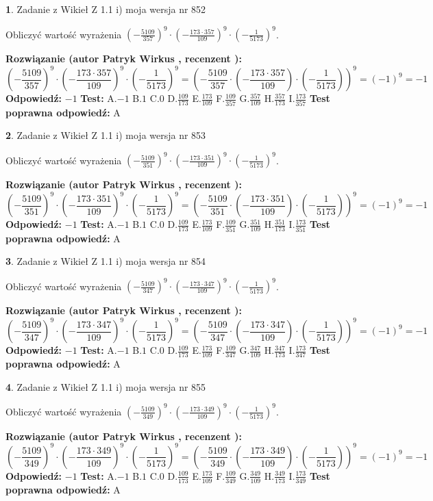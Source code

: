\documentclass[12pt, a4paper]{article}
\theoremstyle{definition} %
\newtheorem{zad}{}
\newcommand{\zadStart}[1]{\begin{zad}#1\newline}
\newcommand{\zadStop}{\end{zad}}
\newcommand{\rozwStart}[2]{\noindent \textbf{Rozwiązanie (autor #1 , recenzent #2): }\newline}
\newcommand{\rozwStop}{\newline}
\newcommand{\odpStart}{\noindent \textbf{Odpowiedź:}\newline}
\newcommand{\odpStop}{\newline}
\newcommand{\testStart}{\noindent \textbf{Test:}\newline}
\newcommand{\testStop}{\newline}
\newcommand{\kluczStart}{\noindent \textbf{Test poprawna odpowiedź:}\newline}
\newcommand{\kluczStop}{\newline}
\begin{document}
\zadStart{Zadanie z Wikieł Z 1.1 i) moja wersja nr 852}

Obliczyć wartość wyrażenia $(-\frac{5109}{357})^{9} \cdot (-\frac{173 \cdot 357}{109})^{9} \cdot (-\frac{1}{5173})^{9}$.
\zadStop
\rozwStart{Patryk Wirkus}{}
$$(-\frac{5109}{357})^{9} \cdot (-\frac{173 \cdot 357}{109})^{9} \cdot (-\frac{1}{5173})^{9} = (-\frac{5109}{357} \cdot (-\frac{173 \cdot 357}{109}) \cdot (-\frac{1}{5173}))^{9} = (-1)^{9} = -1$$
\rozwStop
\odpStart
$-1$
\odpStop
\testStart
A.$-1$ B.$1$ C.$0$ D.$\frac{109}{173}$ E.$\frac{173}{109}$
F.$\frac{109}{357}$ G.$\frac{357}{109}$
H.$\frac{357}{173}$
I.$\frac{173}{357}$
\testStop
\kluczStart
A
\kluczStop



\zadStart{Zadanie z Wikieł Z 1.1 i) moja wersja nr 853}

Obliczyć wartość wyrażenia $(-\frac{5109}{351})^{9} \cdot (-\frac{173 \cdot 351}{109})^{9} \cdot (-\frac{1}{5173})^{9}$.
\zadStop
\rozwStart{Patryk Wirkus}{}
$$(-\frac{5109}{351})^{9} \cdot (-\frac{173 \cdot 351}{109})^{9} \cdot (-\frac{1}{5173})^{9} = (-\frac{5109}{351} \cdot (-\frac{173 \cdot 351}{109}) \cdot (-\frac{1}{5173}))^{9} = (-1)^{9} = -1$$
\rozwStop
\odpStart
$-1$
\odpStop
\testStart
A.$-1$ B.$1$ C.$0$ D.$\frac{109}{173}$ E.$\frac{173}{109}$
F.$\frac{109}{351}$ G.$\frac{351}{109}$
H.$\frac{351}{173}$
I.$\frac{173}{351}$
\testStop
\kluczStart
A
\kluczStop



\zadStart{Zadanie z Wikieł Z 1.1 i) moja wersja nr 854}

Obliczyć wartość wyrażenia $(-\frac{5109}{347})^{9} \cdot (-\frac{173 \cdot 347}{109})^{9} \cdot (-\frac{1}{5173})^{9}$.
\zadStop
\rozwStart{Patryk Wirkus}{}
$$(-\frac{5109}{347})^{9} \cdot (-\frac{173 \cdot 347}{109})^{9} \cdot (-\frac{1}{5173})^{9} = (-\frac{5109}{347} \cdot (-\frac{173 \cdot 347}{109}) \cdot (-\frac{1}{5173}))^{9} = (-1)^{9} = -1$$
\rozwStop
\odpStart
$-1$
\odpStop
\testStart
A.$-1$ B.$1$ C.$0$ D.$\frac{109}{173}$ E.$\frac{173}{109}$
F.$\frac{109}{347}$ G.$\frac{347}{109}$
H.$\frac{347}{173}$
I.$\frac{173}{347}$
\testStop
\kluczStart
A
\kluczStop



\zadStart{Zadanie z Wikieł Z 1.1 i) moja wersja nr 855}

Obliczyć wartość wyrażenia $(-\frac{5109}{349})^{9} \cdot (-\frac{173 \cdot 349}{109})^{9} \cdot (-\frac{1}{5173})^{9}$.
\zadStop
\rozwStart{Patryk Wirkus}{}
$$(-\frac{5109}{349})^{9} \cdot (-\frac{173 \cdot 349}{109})^{9} \cdot (-\frac{1}{5173})^{9} = (-\frac{5109}{349} \cdot (-\frac{173 \cdot 349}{109}) \cdot (-\frac{1}{5173}))^{9} = (-1)^{9} = -1$$
\rozwStop
\odpStart
$-1$
\odpStop
\testStart
A.$-1$ B.$1$ C.$0$ D.$\frac{109}{173}$ E.$\frac{173}{109}$
F.$\frac{109}{349}$ G.$\frac{349}{109}$
H.$\frac{349}{173}$
I.$\frac{173}{349}$
\testStop
\kluczStart
A
\kluczStop
\end{document}
